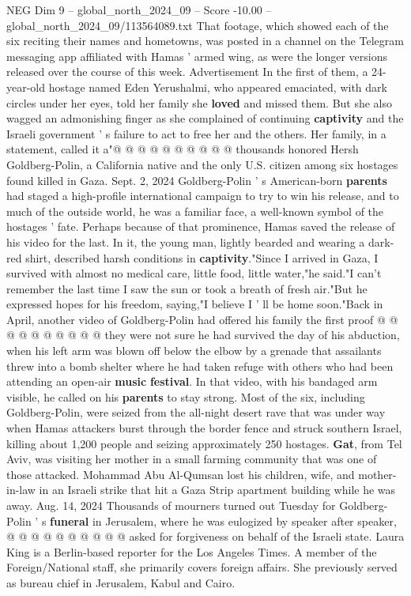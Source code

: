 \begin{textsample}{NEG Dim 9 – global\_north\_2024\_09 – Score -10.00 – global\_north\_2024\_09/113564089.txt}
That footage, which showed each of the six reciting their names and hometowns, was posted in a channel on the Telegram messaging app affiliated with Hamas ' armed wing, as were the longer versions released over the course of this week.
Advertisement In the first of them, a 24-year-old hostage named Eden Yerushalmi, who appeared emaciated, with dark circles under her eyes, told her family she \textbf{loved} and missed them.
But she also wagged an admonishing finger as she complained of continuing \textbf{captivity} and the Israeli government ' s failure to act to free her and the others.
Her family, in a statement, called it a"@ @ @ @ @ @ @ @ @ @ thousands honored Hersh Goldberg-Polin, a California native and the only U.S. citizen among six hostages found killed in Gaza.
Sept. 2, 2024 Goldberg-Polin ' s American-born \textbf{parents} had staged a high-profile international campaign to try to win his release, and to much of the outside world, he was a familiar face, a well-known symbol of the hostages ' fate.
Perhaps because of that prominence, Hamas saved the release of his video for the last.
In it, the young man, lightly bearded and wearing a dark-red shirt, described harsh conditions in \textbf{captivity}."Since I arrived in Gaza, I survived with almost no medical care, little food, little water,"he said."I can't remember the last time I saw the sun or took a breath of fresh air."But he expressed hopes for his freedom, saying,"I believe I ' ll be home soon."Back in April, another video of Goldberg-Polin had offered his family the first proof @ @ @ @ @ @ @ @ @ @ they were not sure he had survived the day of his abduction, when his left arm was blown off below the elbow by a grenade that assailants threw into a bomb shelter where he had taken refuge with others who had been attending an open-air \textbf{music} \textbf{festival}.
In that video, with his bandaged arm visible, he called on his \textbf{parents} to stay strong.
Most of the six, including Goldberg-Polin, were seized from the all-night desert rave that was under way when Hamas attackers burst through the border fence and struck southern Israel, killing about 1,200 people and seizing approximately 250 hostages. \textbf{Gat}, from Tel Aviv, was visiting her mother in a small farming community that was one of those attacked.
Mohammad Abu Al-Qumsan lost his children, wife, and mother-in-law in an Israeli strike that hit a Gaza Strip apartment building while he was away.
Aug. 14, 2024 Thousands of mourners turned out Tuesday for Goldberg-Polin ' s \textbf{funeral} in Jerusalem, where he was eulogized by speaker after speaker, @ @ @ @ @ @ @ @ @ @ asked for forgiveness on behalf of the Israeli state.
Laura King is a Berlin-based reporter for the Los Angeles Times.
A member of the Foreign/National staff, she primarily covers foreign affairs.
She previously served as bureau chief in Jerusalem, Kabul and Cairo.

\end{textsample}
